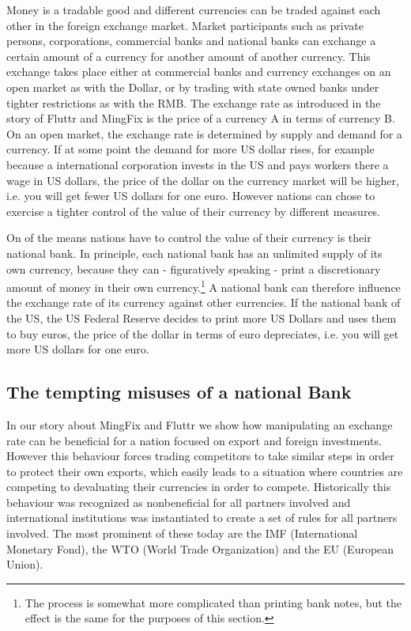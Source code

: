 \documentclass[11pt]{article}
\begin{document}
Money is a tradable good and different currencies can be traded against 
each other in the foreign exchange market. Market participants such as 
private persons, corporations, commercial banks and national banks can 
exchange a certain amount of a currency for another amount of another 
currency. This exchange takes place either at commercial banks and 
currency exchanges on an open market as with the Dollar, or by trading 
with state owned banks under tighter restrictions as with the RMB. The 
exchange rate as introduced in the story of Fluttr and MingFix is the
price of a currency A in terms of currency B. On an open market, the 
exchange rate is determined by supply and demand for a currency. If at 
some point the demand for more US dollar rises, for example because a 
international corporation invests in the US and pays workers there a 
wage in US dollars, the price of the dollar on the currency market will 
be higher, i.e. you will get fewer US dollars for one euro. However 
nations can chose to exercise a tighter control of the value of their 
currency by different measures.

On of the means nations have to control the value of their currency is 
their national bank. In principle, each national bank has an unlimited 
supply of its own currency, because they can - figuratively speaking - 
print a discretionary amount of money in their own 
currency.\footnote{The process is somewhat more complicated than 
printing bank notes, but the effect is the same for the purposes of this 
section.} A national bank can therefore influence the exchange rate of 
its currency against other currencies. If the national bank of the US, 
the US Federal Reserve decides to print more US Dollars and uses them to 
buy euros, the price of the dollar in terms of euro depreciates, i.e.  
you will get more US dollars for one euro.

\subsection{The tempting misuses of a national Bank}

In our story about MingFix and Fluttr we show how manipulating an 
exchange rate can be beneficial for a nation focused on export and 
foreign investments. However this behaviour forces trading competitors 
to take similar steps in order to protect their own exports, which 
easily leads to a situation where countries are competing to devaluating 
their currencies in order to compete. Historically this behaviour was 
recognized as nonbeneficial for all partners involved and international 
institutions was instantiated to create a set of rules for all partners 
involved. The most prominent of these today are the IMF (International 
Monetary Fond), the WTO (World Trade Organization) and the EU (European 
Union).
\end{document}
